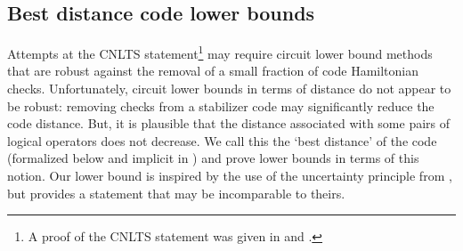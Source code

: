 \documentclass{toc}
\begin{document}
\subsection{Best distance code lower bounds}

Attempts at the CNLTS statement\footnote{A proof of the CNLTS statement was given in \cite{cnlts-proof} and \cite{nlts-proof}.} may require circuit lower bound methods that are
robust %
against %
the removal of a small fraction of code Hamiltonian checks. Unfortunately, circuit lower bounds in terms of distance do not appear to be robust: removing checks from a stabilizer code may significantly reduce the code distance. But, it is plausible that the distance associated with some pairs of logical operators does not decrease. We call this the `best distance' of the code (formalized below and implicit in \cite{8104078}) and prove lower bounds in terms of this notion. Our lower bound is inspired by the use of the uncertainty principle from \cite{8104078}, but provides a statement that may be incomparable to theirs.
\end{document}
